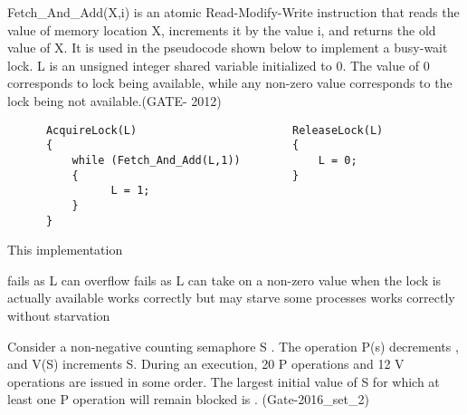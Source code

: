 \vspace{0.08in}


\begin{minipage}{\linewidth}

  \question  Fetch\_And\_Add(X,i) is an atomic Read-Modify-Write instruction that reads the value of memory
             location X, increments it by the value i, and returns the old value of X.
             It is used in the pseudocode shown below to implement a busy-wait lock.
             L is an unsigned integer shared variable initialized to 0.
             The value of 0 corresponds to lock being available, while any non-zero value corresponds to the lock
             being not available.(GATE- 2012)

  \begin{lstlisting}
      AcquireLock(L)                        ReleaseLock(L)
      {                                     {
          while (Fetch_And_Add(L,1))            L = 0;
          {                                 }
                L = 1;
          }
      }

  \end{lstlisting}
  This implementation

  \begin{choices}
    \choice  fails as L can overflow
    \choice  fails as L can take on a non-zero value when the lock is actually available
    \choice  works correctly but may starve some processes
    \choice  works correctly without starvation
  \end{choices}

  \end{minipage}

\vspace{0.08in}


\begin{minipage}{\linewidth}

  \question  Consider a non-negative counting semaphore S . The operation P(s) decrements , and V(S) increments S.
             During an execution, 20 P operations and 12 V operations are issued in some order.
             The largest initial value of S for which at least one P operation will remain blocked is \fillin[]. (Gate-2016\_set\_2)
  \end{minipage}
\vspace{0.08in}

